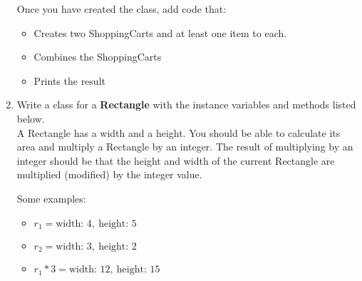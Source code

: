 \documentclass{article}
\begin{document}
\begin{enumerate}
		Once you have created the class, add code that:
		\begin{itemize}
			\item Creates two ShoppingCarts and at least one item to each.
			\item Combines the ShoppingCarts
			\item Prints the result
		\end{itemize}




	\item
		Write a class for a \textbf{Rectangle} with the instance variables and methods 
		listed below.\\
		A Rectangle has a width and a height. You should be able to calculate its area	and multiply 
		a Rectangle by an integer. The result of multiplying by an integer should be that the height 
		and width of the current Rectangle are multiplied (modified) by the integer value.

		\begin{minipage}[t]{0.7\textwidth}
			Some examples:
			\begin{itemize}
				\item $r_1 = \text{width: } 4,\ \text{height: } 5$
				\item $r_2 = \text{width: } 3,\ \text{height: } 2$
				\item $r_1 * 3 = \text{width: } 12,\ \text{height: } 15$
			\end{itemize}


\end{minipage}
\end{enumerate}
\end{document}
